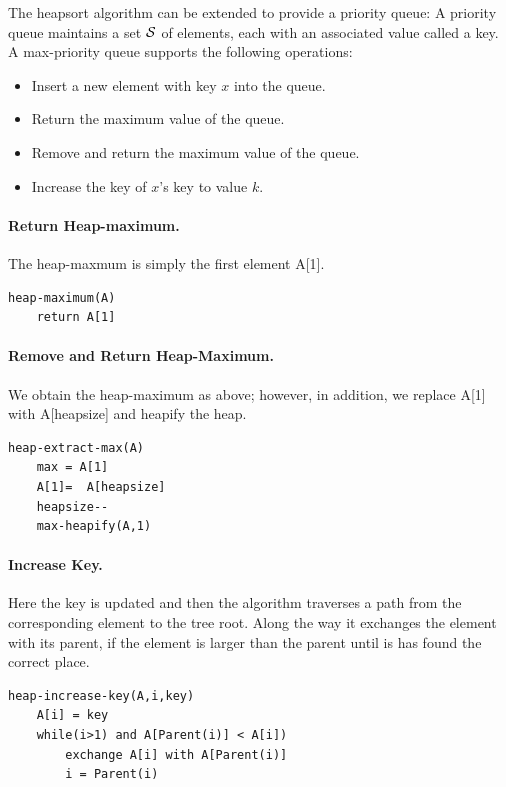 
The heapsort algorithm can be extended to provide a priority queue: A priority queue maintains a set $\mathcal{S}$ of elements, each with an associated value called a key. A max-priority queue supports the following operations:

\begin{itemize}
\item Insert a new element with key $x$ into the queue.
\item Return the maximum value of the queue.
\item Remove and return the maximum value of the queue.
\item Increase the key of $x$'s key to value $k$.
\end{itemize}


\paragraph{Return Heap-maximum.} The heap-maxmum is simply the first element A[1].

\begin{verbatim}
heap-maximum(A)
    return A[1]
\end{verbatim}


\paragraph{Remove and Return Heap-Maximum.} We obtain the heap-maximum as above; however, in addition, we replace A[1] with A[heapsize] and heapify the heap.

\begin{verbatim}
heap-extract-max(A)
    max = A[1]
    A[1]=  A[heapsize]
    heapsize--
    max-heapify(A,1)
\end{verbatim}


\paragraph{Increase Key.} Here the key is updated and then the algorithm traverses a path from the corresponding element to the tree root. Along the way it exchanges the element with its parent, if the element is larger than the parent until is has found the correct place.

\begin{verbatim}
heap-increase-key(A,i,key)
    A[i] = key
    while(i>1) and A[Parent(i)] < A[i])
        exchange A[i] with A[Parent(i)]
        i = Parent(i)
\end{verbatim}

